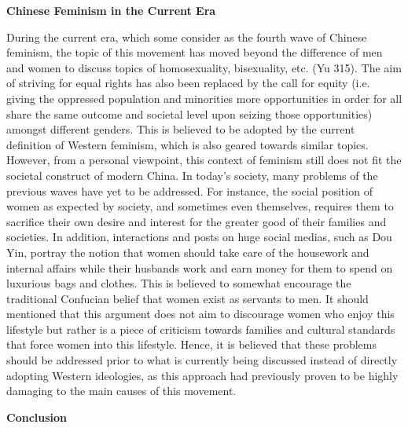 \documentclass[12pt]{article}
\begin{document}
\begin{flushleft}
		\vspace{0.3cm}
		\noindent \textbf{Chinese Feminism in the Current Era}
		
		\noindent 
		During the current era, which some consider as the fourth wave of Chinese feminism, the topic of this movement has moved beyond the difference of men and women to discuss topics of homosexuality, bisexuality, etc. (Yu 315). The aim of striving for equal rights has also been replaced by the call for equity (i.e. giving the oppressed population and minorities more opportunities in order for all share the same outcome and societal level upon seizing those opportunities) amongst different genders. This is believed to be adopted by the current definition of Western feminism, which is also geared towards similar topics. However, from a personal viewpoint, this context of feminism still does not fit the societal construct of modern China. In today’s society, many problems of the previous waves have yet to be addressed. For instance, the social position of women as expected by society, and sometimes even themselves, requires them to sacrifice their own desire and interest for the greater good of their families and societies. In addition, interactions and posts on huge social medias, such as Dou Yin, portray the notion that women should take care of the housework and internal affairs while their husbands work and earn money for them to spend on luxurious bags and clothes. This is believed to somewhat encourage the traditional Confucian belief that women exist as servants to men. It should mentioned that this argument does not aim to discourage women who enjoy this lifestyle but rather is a piece of criticism towards families and cultural standards that force women into this lifestyle. Hence, it is believed that these problems should be addressed prior to what is currently being discussed instead of directly adopting Western ideologies, as this approach had previously proven to be highly damaging to the main causes of this movement.
		
		\vspace{0.3cm}
		\noindent \textbf{Conclusion}
		

\end{flushleft}
\end{document}
